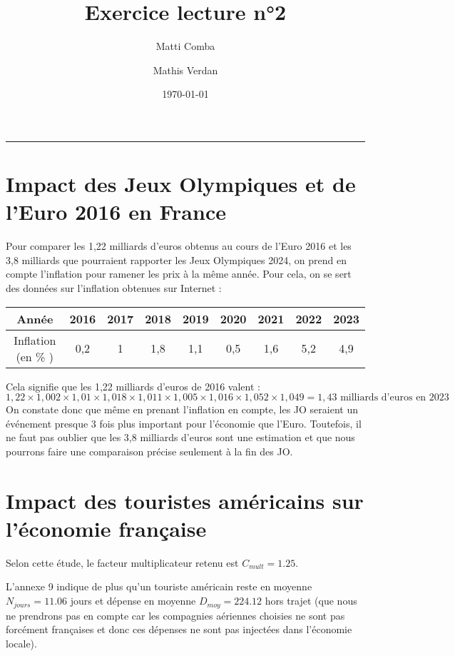 \documentclass{article}
\title{\Huge \textbf{Exercice lecture n°2}}
\author{Matti Comba \and Mathis Verdan}
\date{\today}
\begin{document}
\maketitle
\begin{center}
  \rule{\linewidth}{0.5mm}
\end{center}


\section{Impact des Jeux Olympiques et de l'Euro 2016 en France}
Pour comparer les 1,22 milliards d'euros obtenus au cours de l'Euro 2016 et les 3,8 milliards que pourraient rapporter les Jeux Olympiques 2024, on prend en compte l'inflation pour ramener les prix à la même année. Pour cela, on se sert des données sur l'inflation obtenues sur Internet : 

\begin{center}
    \begin{tabular}{ | c | c | c |  c |  c |  c |  c |  c |  c | }
      \hline
      Année & 2016 & 2017 & 2018 & 2019 & 2020 & 2021 & 2022 & 2023 \\ \hline
      Inflation (en \% ) & 0,2 & 1 & 1,8 & 1,1 & 0,5 & 1,6 & 5,2 & 4,9 \\ \hline
    \end{tabular}
\end{center}

Cela signifie que les 1,22 milliards d'euros de 2016 valent :
$$ 1,22 \times 1,002 \times 1,01 \times 1,018 \times 1,011 \times 1,005 \times 1,016 \times 1,052 \times 1,049 = 1,43 \text{ milliards d'euros en 2023}$$
On constate donc que même en prenant l'inflation en compte, les JO seraient un événement presque 3 fois plus important pour l'économie que l'Euro. Toutefois, il ne faut pas oublier que les 3,8 milliards d'euros sont une estimation et que nous pourrons faire une comparaison précise seulement à la fin des JO.

\section{Impact des touristes américains sur l'économie française}
  
    Selon cette étude, le facteur multiplicateur retenu est $ C_{mult} = 1.25$. 
  
  L'annexe 9 indique de plus qu'un touriste américain reste en moyenne $N_{jours} = 11.06$ jours et dépense en moyenne $D_{moy}=224.12 $ \texteuro hors trajet (que nous ne prendrons pas en compte car les compagnies aériennes choisies ne sont pas forcément françaises et donc ces dépenses ne sont pas injectées dans l'économie locale).
\end{document}
